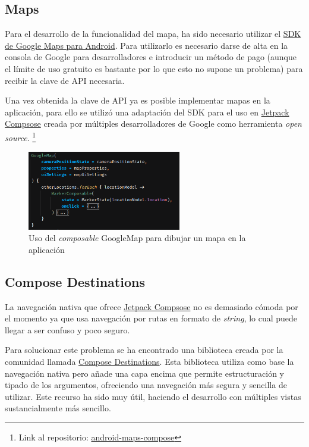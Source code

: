 \subsection{Maps}
Para el desarrollo de la funcionalidad del mapa, ha sido necesario utilizar el \href{https://developers.google.com/maps/documentation/android-sdk}{SDK de Google Maps para Android}. Para utilizarlo es necesario darse de alta en la consola de Google para desarrolladores e introducir un método de pago (aunque el límite de uso gratuito es bastante por lo que esto no supone un problema) para recibir la clave de API necesaria.

Una vez obtenida la clave de API ya es posible implementar mapas en la aplicación, para ello se utilizó una adaptación del SDK para el uso en \hyperlink{subsec:compose}{Jetpack Compsose} creada por múltiples desarrolladores de Google como herramienta \textit{open source}.
\footnote{Link al repositorio: \href{https://github.com/googlemaps/android-maps-compose}{android-maps-compose}}
\begin{figure}[h]
	\centering
	\includegraphics[width = 0.6\textwidth]{Imagenes/Fuentes/maps_compose.png}
	\caption{Uso del \textit{composable} GoogleMap para dibujar un mapa en la aplicación}
	\label{fig:maps_compose}
\end{figure}
\subsection{Compose Destinations}
La navegación nativa que ofrece \hyperlink{subsec:compose}{Jetpack Compsose} no es demasiado cómoda por el momento ya que usa navegación por rutas en formato de \textit{string}, lo cual puede llegar a ser confuso y poco seguro. 

Para solucionar este problema se ha encontrado una biblioteca creada por la comunidad llamada \href{https://github.com/raamcosta/compose-destinations}{Compose Destinations}. Esta biblioteca utiliza como base la navegación nativa pero añade una capa encima que permite estructuración y tipado de los argumentos, ofreciendo una navegación más segura y sencilla de utilizar. Este recurso ha sido muy útil, haciendo el desarrollo con múltiples vistas sustancialmente más sencillo.

